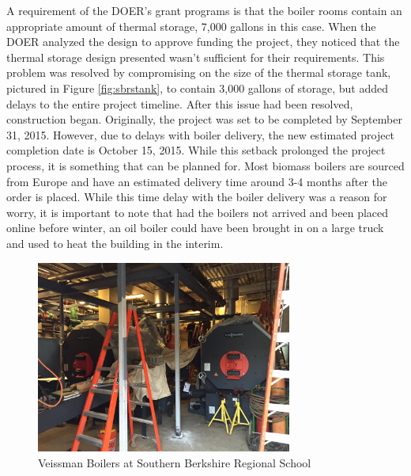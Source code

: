 \par A requirement of the DOER's grant programs is that the boiler rooms contain an appropriate amount of thermal storage, 7,000 gallons in this case. When the DOER analyzed the design to approve funding the project, they noticed that the thermal storage design presented wasn't sufficient for their requirements. This problem was resolved by compromising on the size of the thermal storage tank, pictured in Figure \ref{fig:sbrstank}, to contain 3,000 gallons of storage, but added delays to the entire project timeline. After this issue had been resolved, construction began. Originally, the project was set to be completed by September 31, 2015. However, due to delays with boiler delivery, the new estimated project completion date is October 15, 2015. While this setback prolonged the project process, it is something that can be planned for. Most biomass boilers are sourced from Europe and have an estimated delivery time around 3-4 months after the order is placed. While this time delay with the boiler delivery was a reason for worry, it is important to note that had the boilers not arrived and been placed online before winter, an oil boiler could have been brought in on a large truck and used to heat the building in the interim.
\begin{figure}[H]
\centering
\includegraphics[width=0.75\textwidth]{findingschapter/southernberkshireboilers}
\caption{Veissman Boilers at Southern Berkshire Regional School}
\label{fig:sbrsboilers}
\end{figure}

